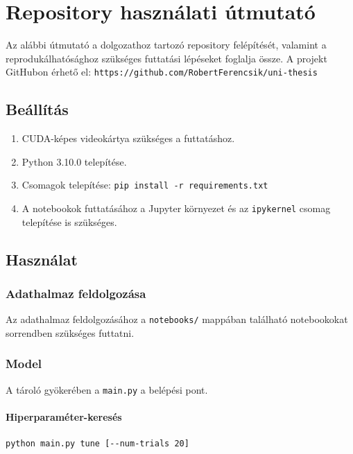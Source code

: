 \pagestyle{empty}

\section*{Repository használati útmutató}

\noindent
Az alábbi útmutató a dolgozathoz tartozó repository felépítését, valamint a reprodukálhatósághoz szükséges futtatási lépéseket foglalja össze. 
A projekt GitHubon érhető el: \texttt{https://github.com/RobertFerencsik/uni-thesis}

\subsection*{Beállítás}

\begin{enumerate}
    \item CUDA-képes videokártya szükséges a futtatáshoz.
    \item Python 3.10.0 telepítése.
    \item Csomagok telepítése: \texttt{pip install -r requirements.txt}
    \item A notebookok futtatásához a Jupyter környezet és az \texttt{ipykernel} csomag telepítése is szükséges.
\end{enumerate}

\subsection*{Használat}

\subsubsection*{Adathalmaz feldolgozása}

Az adathalmaz feldolgozásához a \texttt{notebooks/} mappában található notebookokat sorrendben szükséges futtatni.

\subsubsection*{Model}

A tároló gyökerében a \texttt{main.py} a belépési pont.

\paragraph{Hiperparaméter-keresés}

\begin{verbatim}
python main.py tune [--num-trials 20]
\end{verbatim}

